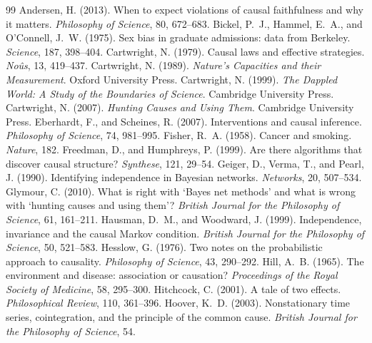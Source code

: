 \documentclass{situationist-preprint}
\begin{document}
\begin{thebibliography}{99}\small
{} Andersen, H. (2013). When to expect violations of causal faithfulness and why it matters. \emph{Philosophy of Science}, 80, 672--683.
 Bickel, P.~J., Hammel, E.~A., and O'Connell, J.~W. (1975). Sex bias in graduate admissions: data from Berkeley. \emph{Science}, 187, 398--404.
 Cartwright, N. (1979). Causal laws and effective strategies. \emph{No\^us}, 13, 419--437.
 Cartwright, N. (1989). \emph{Nature's Capacities and their Measurement}. Oxford University Press.
 Cartwright, N. (1999). \emph{The Dappled World: A Study of the Boundaries of Science}. Cambridge University Press.
 Cartwright, N. (2007). \emph{Hunting Causes and Using Them}. Cambridge University Press.
 Eberhardt, F., and Scheines, R. (2007). Interventions and causal inference. \emph{Philosophy of Science}, 74, 981--995.
 Fisher, R.~A. (1958). Cancer and smoking. \emph{Nature}, 182.
 Freedman, D., and Humphreys, P. (1999). Are there algorithms that discover causal structure? \emph{Synthese}, 121, 29--54.
 Geiger, D., Verma, T., and Pearl, J. (1990). Identifying independence in Bayesian networks. \emph{Networks}, 20, 507--534.
 Glymour, C. (2010). What is right with `Bayes net methods' and what is wrong with `hunting causes and using them'? \emph{British Journal for the Philosophy of Science}, 61, 161--211.
 Hausman, D.~M., and Woodward, J. (1999). Independence, invariance and the causal Markov condition. \emph{British Journal for the Philosophy of Science}, 50, 521--583.
 Hesslow, G. (1976). Two notes on the probabilistic approach to causality. \emph{Philosophy of Science}, 43, 290--292.
 Hill, A.~B. (1965). The environment and disease: association or causation? \emph{Proceedings of the Royal Society of Medicine}, 58, 295--300.
 Hitchcock, C. (2001). A tale of two effects. \emph{Philosophical Review}, 110, 361--396.
 Hoover, K.~D. (2003). Nonstationary time series, cointegration, and the principle of the common cause. \emph{British Journal for the Philosophy of Science}, 54.

\end{thebibliography}
\end{document}
